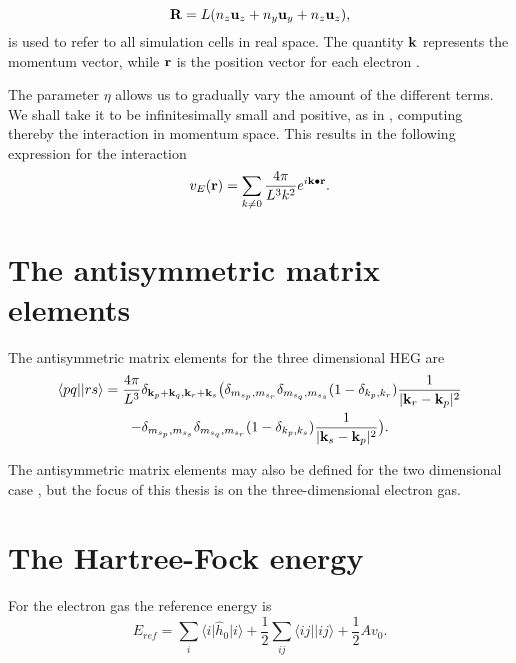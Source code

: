 \begin{equation}
\bold{R} = L (n_z \bold{u}_z + n_y \bold{u}_y + n_z \bold{u}_z),
\end{equation}
is used to refer to all simulation cells in real space. The quantity
$\bold{k}$ represents the momentum vector, while $\bold{r}$ is the
position vector for each electron \cite{Baardsen2014}.

The parameter $\eta$ allows us to gradually vary the amount of the 
different terms. We shall take it to be infinitesimally small and
positive, as in \cite[p.97]{Baardsen2014}, computing thereby the 
interaction in momentum space. This results in the
following expression for the interaction
\begin{equation}
v_{E}(\bold{r}) = \sum_{k \neq 0} \frac{4 \pi}{L^3 k^2} e^{i \bold{k} \bullet \bold{r}}  .
\label{eqn:HEG_interaction2}
\end{equation}

\section{The antisymmetric matrix elements}

The antisymmetric matrix elements for the three dimensional HEG are \cite{Baardsen2014}
\begin{multline}
\langle pq \vert \vert rs \rangle = \frac{4\pi}{L^3} \delta_{\bold{k}_p + \bold{k}_q , \bold{k}_r + \bold{k}_s} \big{(}  \delta_{m_{s_p}, m_{s_r}}  \delta_{m_{s_q}, m_{s_s}} (1-\delta_{k_p, k_r}) \frac{1}{\vert \bold{k}_r -\bold{k}_p \vert^2 } \\
-\delta_{m_{s_p}, m_{s_s}}  \delta_{m_{s_q}, m_{s_r}} (1-\delta_{k_p, k_s}) \frac{1}{\vert \bold{k}_s -\bold{k}_p \vert^2 } 
 \big{)}.
\end{multline}

The antisymmetric matrix elements may also be defined for the two dimensional case \cite{Baardsen2014}, but the focus of this thesis is on the three-dimensional electron gas.

\section{The Hartree-Fock energy}

For the electron gas the reference energy is  \cite{Baardsen2014}
\begin{equation}
E_{ref} = \sum_i \langle i \vert \hat{h}_0 \vert i \rangle + \frac{1}{2} \sum_{ij} \langle ij \vert  \vert ij \rangle + \frac{1}{2} Av_0 .
\end{equation}


